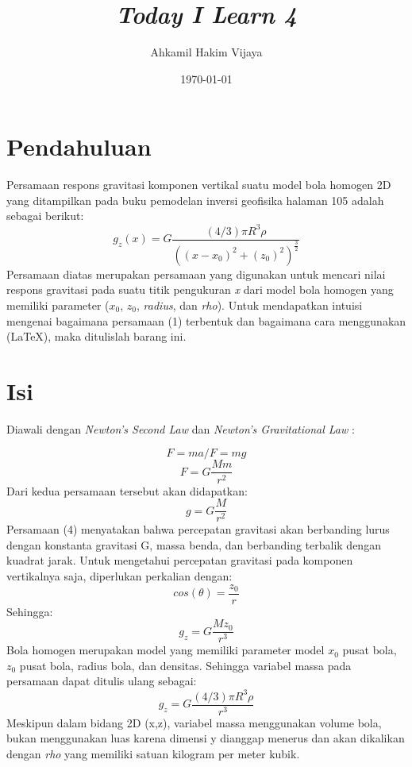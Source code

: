 \documentclass{article}
\title{\textit{Today I Learn 4}}
\author{Ahkamil Hakim Vijaya}
\date{\today}
\begin{document}
\maketitle

\section{Pendahuluan}
Persamaan respons gravitasi komponen vertikal suatu model bola homogen 2D yang ditampilkan pada buku pemodelan inversi geofisika halaman 105 adalah sebagai berikut:
\begin{equation}
    g_z(x)=G \frac{(4/3) \pi R^3 \rho}{((x-x_0)^2 + (z_0)^2)^\frac{3}{2}}
\end{equation}
Persamaan diatas merupakan persamaan yang digunakan untuk mencari nilai respons gravitasi pada suatu titik pengukuran \textit{x} dari model bola homogen yang memiliki parameter ($x_0$, $z_0$, \textit{radius}, dan \textit{rho}).
Untuk mendapatkan intuisi mengenai bagaimana persamaan (1) terbentuk dan bagaimana cara menggunakan (\LaTeX), maka ditulislah barang ini.
\section{Isi}
Diawali dengan \textit{Newton's Second Law} dan \textit{Newton's Gravitational Law} :

\begin{equation}
    F =  ma / F=mg
\end{equation}
\begin{equation}
    F = G \frac{M m}{r^2}
\end{equation}
Dari kedua persamaan tersebut akan didapatkan:
\begin{equation}
    g = G \frac{M}{r^2}
\end{equation}
Persamaan (4) menyatakan bahwa percepatan gravitasi akan berbanding lurus dengan konstanta gravitasi G, massa benda, dan berbanding terbalik dengan kuadrat jarak. Untuk mengetahui percepatan gravitasi pada komponen vertikalnya saja, diperlukan perkalian dengan: \begin{equation}
    cos(\theta) = \frac{z_0}{r}
\end{equation}
Sehingga:
\begin{equation}
    g_z = G \frac{M z_0}{r^3}
\end{equation}
Bola homogen merupakan model yang memiliki parameter model $x_0$ pusat bola, $z_0$ pusat bola, radius bola, dan densitas. Sehingga variabel massa pada persamaan dapat ditulis ulang sebagai:
\begin{equation}
    g_z = G \frac{(4/3) \pi R^3 \rho}{r^3}
\end{equation}
Meskipun dalam bidang 2D (x,z), variabel massa menggunakan volume bola, bukan menggunakan luas karena dimensi y dianggap  menerus dan akan dikalikan dengan \textit{rho} yang memiliki satuan kilogram per meter kubik. 
\end{document}
